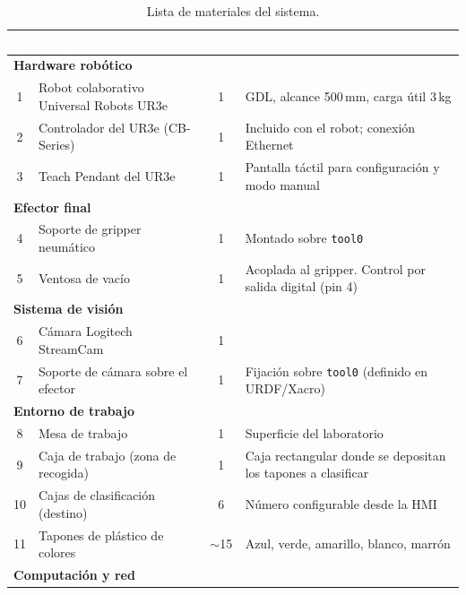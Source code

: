 \documentclass[12pt,a4paper]{article}
\newcommand{\rowA}{\rowcolor{LightGray}}
\newcommand{\rowB}{\rowcolor{white}}
\newcommand{\code}[1]{%
  \begingroup
  \def\_{\char`_\penalty0 }%
  \def\/{\char`/\penalty0 }%
  \texttt{\small #1}%
  \endgroup}
\begin{document}
\begin{table}[H]
\centering
\caption{Lista de materiales del sistema.}
\label{tab:bom}
\small
\renewcommand{\arraystretch}{1.3}
\begin{tabularx}{\textwidth}{|c|>{\RaggedRight\arraybackslash}X|c|>{\RaggedRight\arraybackslash}X|}
  \hline
  \rowcolor{BlueHeader}
  \textcolor{white}{\bfseries \#} &
  \textcolor{white}{\bfseries Componente} &
  \textcolor{white}{\bfseries Ud.} &
  \textcolor{white}{\bfseries Observaciones} \\
  \hline
  \multicolumn{4}{|l|}{\cellcolor{BlueCell}\bfseries Hardware robótico} \\
  \hline
  \rowA 1 & Robot colaborativo Universal Robots UR3e & 1 & 6 GDL, alcance 500\,mm, carga útil 3\,kg \\
  \rowB 2 & Controlador del UR3e (CB-Series) & 1 & Incluido con el robot; conexión Ethernet \\
  \rowA 3 & Teach Pendant del UR3e & 1 & Pantalla táctil para configuración y modo manual \\
  \hline
  \multicolumn{4}{|l|}{\cellcolor{BlueCell}\bfseries Efector final} \\
  \hline
  \rowB 4 & Soporte de gripper neumático & 1 & Montado sobre \code{tool0} \\
  \rowA 5 & Ventosa de vacío & 1 & Acoplada al gripper. Control por salida digital (pin 4) \\
  \hline
  \multicolumn{4}{|l|}{\cellcolor{BlueCell}\bfseries Sistema de visión} \\
  \hline
  \rowB 6 & Cámara Logitech StreamCam & 1 &  \\
  \rowA 7 & Soporte de cámara sobre el efector & 1 & Fijación sobre \code{tool0} (definido en URDF/Xacro) \\
  \hline
  \multicolumn{4}{|l|}{\cellcolor{BlueCell}\bfseries Entorno de trabajo} \\
  \hline
  \rowB 8 & Mesa de trabajo & 1 & Superficie del laboratorio  \\
  \rowA 9 & Caja de trabajo (zona de recogida) & 1 & Caja rectangular donde se depositan los tapones a clasificar \\
  \rowB 10 & Cajas de clasificación (destino) & 6 & Número configurable desde la HMI \\
  \rowA 11 & Tapones de plástico de colores  & $\sim$15 & Azul, verde, amarillo, blanco, marrón \\
  \hline
  \multicolumn{4}{|l|}{\cellcolor{BlueCell}\bfseries Computación y red} \\

\end{tabularx}
\end{table}
\end{document}
